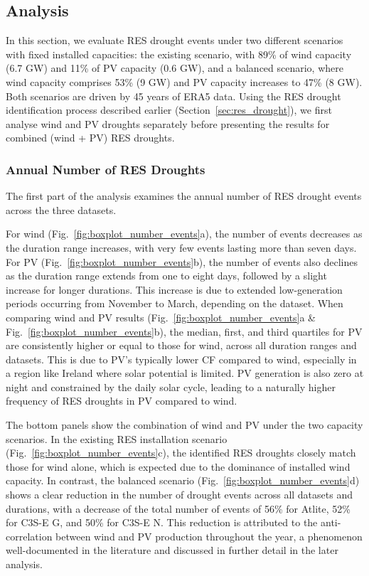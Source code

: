 \documentclass[a4paper, 11pt]{article}
\begin{document}
\newpage
\subsection{Analysis}
\label{sec:Analysis}

In this section, we evaluate RES drought events under two different scenarios with fixed installed capacities: the existing scenario, with 89\% of wind capacity (6.7 GW) and 11\% of PV capacity (0.6 GW), and a balanced scenario, where wind capacity comprises 53\% (9 GW) and PV capacity increases to 47\% (8 GW). Both scenarios are driven by 45 years of ERA5 data. Using the RES drought identification process described earlier (Section~\ref{sec:res_drought}), we first analyse wind and PV droughts separately before presenting the results for combined (wind + PV) RES droughts.

\subsubsection{Annual Number of RES Droughts}

The first part of the analysis examines the annual number of RES drought events across the three datasets. 

For wind (Fig.~\ref{fig:boxplot_number_events}a), the number of events decreases as the duration range increases, with very few events lasting more than seven days. For PV (Fig.~\ref{fig:boxplot_number_events}b), the number of events also declines as the duration range extends from one to eight days, followed by a slight increase for longer durations. This increase is due to extended low-generation periods occurring from November to March, depending on the dataset. When comparing wind and PV results (Fig.~\ref{fig:boxplot_number_events}a \& Fig.~\ref{fig:boxplot_number_events}b), the median, first, and third quartiles for PV are consistently higher or equal to those for wind, across all duration ranges and datasets. This is due to PV's typically lower CF compared to wind, especially in a region like Ireland where solar potential is limited. PV generation is also zero at night and constrained by the daily solar cycle, leading to a naturally higher frequency of RES droughts in PV compared to wind.

The bottom panels show the combination of wind and PV under the  two capacity scenarios. In the existing RES installation scenario (Fig.~\ref{fig:boxplot_number_events}c), the identified RES droughts closely match those for wind alone, which is expected due to the dominance of installed wind capacity. In contrast, the balanced scenario (Fig.~\ref{fig:boxplot_number_events}d) shows a clear reduction in the number of drought events across all datasets and durations, with a decrease of the total number of events of 56\% for Atlite, 52\% for C3S-E G, and 50\% for C3S-E N. This reduction is attributed to the anti-correlation between wind and PV production throughout the year, a phenomenon well-documented in the literature \cite{kaspar2019drought} and discussed in further detail in the later analysis.
\end{document}
